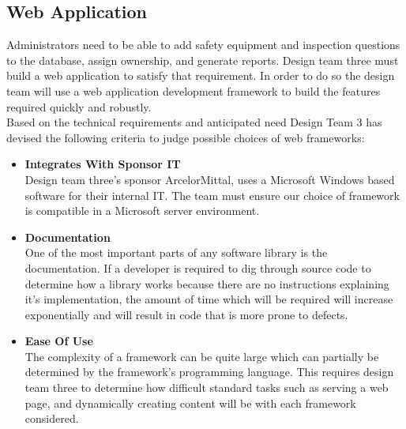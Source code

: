 \documentclass[Letter,11pt]{article}
\begin{document}
	\subsection{Web Application}\label{WEBAPP}
		Administrators need to be able to add safety equipment and inspection questions to the database, assign ownership, and generate reports. Design team three must build a web application to satisfy that requirement. In order to do so the design team will use a web application development framework to build the features required quickly and robustly.
		\\
		Based on the technical requirements and anticipated need Design Team 3 has devised the following criteria to judge possible choices of web frameworks:
		\\
		\begin{minipage}[t]{0.5\textwidth}
		\begin{itemize}
			\item \textbf{Integrates With Sponsor IT}\\
			Design team three's sponsor ArcelorMittal, uses a Microsoft Windows based software for their internal IT. The team must ensure our choice of framework is compatible in a Microsoft server environment.

			\item \textbf{Documentation}\\
			One of the most important parts of any software library is the documentation. If a developer is required to dig through source code to determine how a library works because there are no instructions explaining it's implementation, the amount of time which will be required will increase exponentially and will result in code that is more prone to defects.

			\item \textbf{Ease Of Use} \\
			The complexity of a framework can be quite large which can partially be determined by the framework's programming language. This requires design team three to determine how difficult standard tasks such as serving a web page, and dynamically creating content will be with each framework considered.
		\end{itemize}
		\end{minipage}
\end{document}
